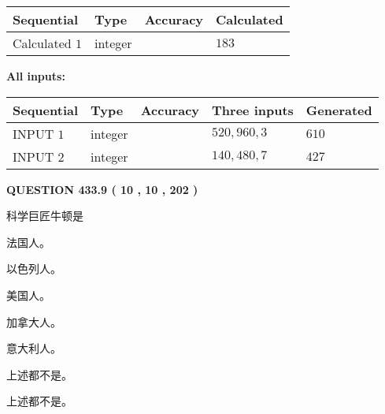 \documentclass{ctexart}
\begin{document}
   
   
   
\noindent{}
   
   
  
  
\noindent\begin{tabular}{|l|l|l|l|}
\hline
 Sequential & Type & Accuracy & Calculated \\ 
\hline
 
 
  Calculated $  1 $ & integer &  & 
  $ 183 $ 
 \\  \hline  
 \end{tabular}
   
   
   
   
\noindent\vspace{0.1in}\hspace{-0.08in} {\textbf{\Large{All inputs: }}}
   
   
  
  
\noindent\begin{tabular}{|l|l|l|l|l|}
\hline
 Sequential & Type & Accuracy & Three inputs & Generated \\ 
\hline
 
 
  INPUT $  1 $ & integer &  & $
 520
 , 
 960
 , 
 3
 $ & $ 610 $ 
 \\  \hline  
 
 
  INPUT $  2 $ & integer &  & $
 140
 , 
 480
 , 
 7
 $ & $ 427 $ 
 \\  \hline  
 \end{tabular}
   
   
  
\vspace{0.2in}
  
{\textbf{\Large{QUESTION
433.9 
 ( 10 , 10 , 202 )
}}}
  
  
科学巨匠牛顿是
 
 
法国人。
 
 
以色列人。
 
 
美国人。
 
 
加拿大人。
 
 
意大利人。
 
 
 上述都不是。
 
 
\noindent{}
 
 
 上述都不是。
 
\end{document}
